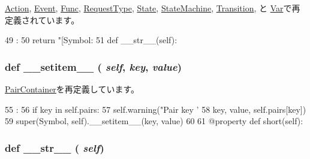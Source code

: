 \hyperlink{classslicc_1_1symbols_1_1Action_1_1Action_ad8b9328939df072e4740cd9a63189744}{Action}, \hyperlink{classslicc_1_1symbols_1_1Event_1_1Event_ad8b9328939df072e4740cd9a63189744}{Event}, \hyperlink{classslicc_1_1symbols_1_1Func_1_1Func_ad8b9328939df072e4740cd9a63189744}{Func}, \hyperlink{classslicc_1_1symbols_1_1RequestType_1_1RequestType_ad8b9328939df072e4740cd9a63189744}{RequestType}, \hyperlink{classslicc_1_1symbols_1_1State_1_1State_ad8b9328939df072e4740cd9a63189744}{State}, \hyperlink{classslicc_1_1symbols_1_1StateMachine_1_1StateMachine_ad8b9328939df072e4740cd9a63189744}{StateMachine}, \hyperlink{classslicc_1_1symbols_1_1Transition_1_1Transition_ad8b9328939df072e4740cd9a63189744}{Transition}, と \hyperlink{classslicc_1_1symbols_1_1Var_1_1Var_ad8b9328939df072e4740cd9a63189744}{Var}で再定義されています。


\begin{DoxyCode}
49                       :
50         return "[Symbol: %
51 
    def __str__(self):
\end{DoxyCode}
\hypertarget{classslicc_1_1symbols_1_1Symbol_1_1Symbol_a09195b01147e970ca71c48b57f653940}{
\subsubsection[{\_\-\_\-setitem\_\-\_\-}]{\setlength{\rightskip}{0pt plus 5cm}def \_\-\_\-setitem\_\-\_\- ( {\em self}, \/   {\em key}, \/   {\em value})}}
\label{classslicc_1_1symbols_1_1Symbol_1_1Symbol_a09195b01147e970ca71c48b57f653940}


\hyperlink{classslicc_1_1util_1_1PairContainer_a09195b01147e970ca71c48b57f653940}{PairContainer}を再定義しています。


\begin{DoxyCode}
55                                      :
56         if key in self.pairs:
57             self.warning("Pair key '%
58                          key, value, self.pairs[key])
59         super(Symbol, self).__setitem__(key, value)
60 
61     @property
    def short(self):
\end{DoxyCode}
\hypertarget{classslicc_1_1symbols_1_1Symbol_1_1Symbol_aa7a4b9bc0941308e362738503137460e}{
\subsubsection[{\_\-\_\-str\_\-\_\-}]{\setlength{\rightskip}{0pt plus 5cm}def \_\-\_\-str\_\-\_\- ( {\em self})}}
\label{classslicc_1_1symbols_1_1Symbol_1_1Symbol_aa7a4b9bc0941308e362738503137460e}



